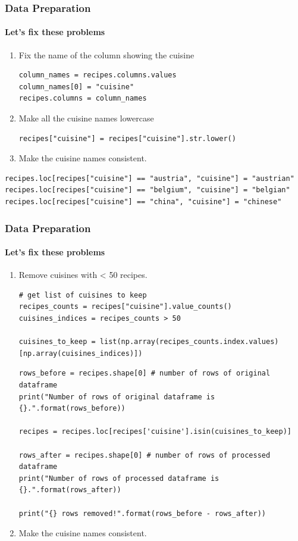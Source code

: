 \documentclass{beamer}
\begin{document}
\begin{frame}[fragile]
	\frametitle{Data Preparation}
	\framesubtitle{Let's fix these problems}
	\begin{enumerate}
		\item Fix the name of the column showing the cuisine
		\begin{lstlisting}
column_names = recipes.columns.values
column_names[0] = "cuisine"
recipes.columns = column_names
		\end{lstlisting}
		\item Make all the cuisine names lowercase
		\begin{lstlisting}
recipes["cuisine"] = recipes["cuisine"].str.lower()
		\end{lstlisting}
	\item Make the cuisine names consistent.
	\end{enumerate}
\begin{lstlisting}
recipes.loc[recipes["cuisine"] == "austria", "cuisine"] = "austrian"
recipes.loc[recipes["cuisine"] == "belgium", "cuisine"] = "belgian"
recipes.loc[recipes["cuisine"] == "china", "cuisine"] = "chinese"
\end{lstlisting}
\end{frame}



\begin{frame}[fragile]
	\frametitle{Data Preparation}
	\framesubtitle{Let's fix these problems}
	\begin{enumerate}
		\item Remove cuisines with < 50 recipes.
		\begin{lstlisting}
# get list of cuisines to keep
recipes_counts = recipes["cuisine"].value_counts()
cuisines_indices = recipes_counts > 50

cuisines_to_keep = list(np.array(recipes_counts.index.values)[np.array(cuisines_indices)])			
		\end{lstlisting}
		\begin{lstlisting}
rows_before = recipes.shape[0] # number of rows of original dataframe
print("Number of rows of original dataframe is {}.".format(rows_before))

recipes = recipes.loc[recipes['cuisine'].isin(cuisines_to_keep)]

rows_after = recipes.shape[0] # number of rows of processed dataframe
print("Number of rows of processed dataframe is {}.".format(rows_after))

print("{} rows removed!".format(rows_before - rows_after))			
		\end{lstlisting}
		\item Make the cuisine names consistent.
	\end{enumerate}
	\begin{lstlisting}
		
	\end{lstlisting}
\end{frame}
\end{document}
